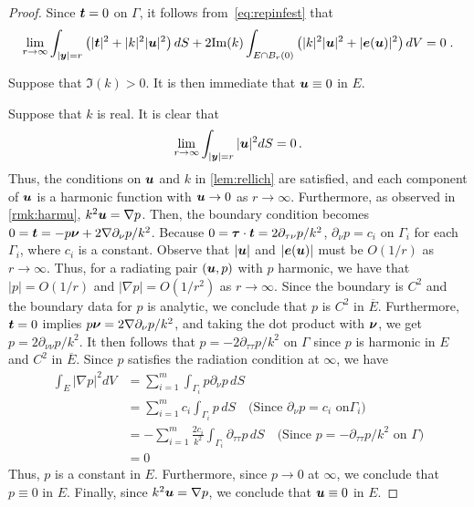 \begin{proof}
Since ${\boldsymbol t} = 0$ on $\Gamma$, it follows
from~\cref{eq:repinfest} that
\begin{equation}
\lim_{r\to\infty}
\int_{|{\boldsymbol y}|=r} \left( |{\boldsymbol t}|^2 + |k|^2 |{\boldsymbol u}|^2 \right) dS +
2 {\textrm{\textup{Im}}}(k) \int_{E \cap B_{r}(0)} \left(|k|^2 |{\boldsymbol u}|^2 + |{\boldsymbol e}({\boldsymbol u})|^2 \right)
dV = 0 \; . \nonumber
\end{equation}

Suppose that $\Im(k) > 0$. It is then immediate
that ${\boldsymbol u} \equiv 0$ in $E$.

Suppose that $k$ is real. It is clear that
\begin{equation}
\lim_{r\to\infty} \int_{|{\boldsymbol y}|=r} |{\boldsymbol u}|^2 dS = 0 \, . \nonumber
\end{equation}
Thus, the conditions on ${\boldsymbol u}$ and $k$ in \cref{lem:rellich}
are satisfied, and each component of ${\boldsymbol u}$ is a harmonic function
with ${\boldsymbol u} \to 0$ as $r \to \infty$. Furthermore, as observed
in \cref{rmk:harmu}, $k^2 {\boldsymbol u} = \nabla p$. Then, the boundary
condition becomes $0 = {\boldsymbol t} = -p {\boldsymbol \nu} + 2 \nabla \partial_\nu p/k^2$.
Because $0 = {\boldsymbol \tau} \cdot {\boldsymbol t} = 2\partial_{\tau\nu} p/k^2$,
$\partial_\nu p  = c_{i}$ on $\Gamma_{i}$ for each $\Gamma_{i}$,
where $c_{i}$ is a constant. 
Observe that $|{\boldsymbol u}|$ and $|{\boldsymbol e}({\boldsymbol u})|$ must be $O(1/r)$ as
$r\to\infty$. Thus,
for a radiating pair $({\boldsymbol u},p)$ with $p$ harmonic,
we have that $|p| = O(1/r)$ and $|\nabla p| = O(1/r^2)$
as $r\to\infty$.
Since the boundary is $C^{2}$ and the boundary data for $p$
is analytic, we conclude that $p$ is $C^{2}$ in
$\overline{E}$.
Furthermore, ${\boldsymbol t}=0$ implies $p {\boldsymbol \nu} = 2\nabla \partial_{\nu} p/k^2$, 
and taking the dot
product with ${\boldsymbol \nu}$, we get
$p = 2\partial_{\nu \nu}p/k^2$. 
It then follows that
$p = -2\partial_{\tau \tau}p/k^2$ on $\Gamma$ since 
$p$ is harmonic in $E$ and $C^{2}$ in $\overline{E}$. 
Since $p$ satisfies the radiation condition at $\infty$,
we have
\begin{equation}
\begin{aligned}
\int_{E} |\nabla p|^2 dV &= 
\sum_{i=1}^{m} \int_{\Gamma_{i}} p \partial_{\nu}p \,dS \\
&= \sum_{i=1}^{m} c_{i} \int_{\Gamma_{i}} p \,dS \quad \text{(Since $\partial_{\nu} p = c_{i}$ on
$\Gamma_{i}$)} \\ 
&= -\sum_{i=1}^{m} \frac{2c_{i}}{k^2} \int_{\Gamma_{i}} \partial_{\tau \tau} p \,dS 
\quad \text{(Since $p = -\partial_{\tau \tau}p/k^2$ on $\Gamma$)} \\
&= 0
\end{aligned}
\end{equation}
Thus, $p$ is a constant in $E$. Furthermore, since $p\to 0$ at $\infty$, 
we conclude that $p\equiv 0$ in $E$. 
Finally, since $k^2 {\boldsymbol u} = \nabla p$, we conclude that ${\boldsymbol u}\equiv 0$ in 
$E$.
\end{proof}



